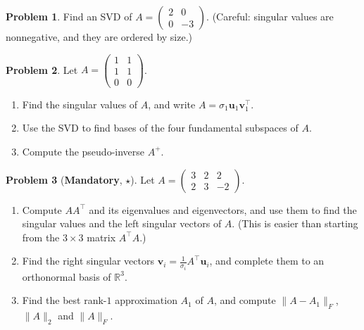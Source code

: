 \documentclass[11pt]{article}
\theoremstyle{definition}
\newtheorem{problem}{Problem}[section]
\newcommand{\mandatory}{\textcolor{red!70!black}{\textbf{Mandatory}}}
\newcommand{\norm}[1]{\lVert #1 \rVert}
\begin{document}
\begin{problem}\label{pr:svd-diag}
    Find an SVD of $A = \begin{pmatrix} 2 & 0 \\ 0 & -3 \end{pmatrix}$. (Careful: singular values are nonnegative, and they are ordered by size.)
\end{problem}

\begin{problem}\label{pr:svd-rank1}
    Let $A = \begin{pmatrix} 1 & 1 \\ 1 & 1 \\ 0 & 0 \end{pmatrix}$.
    \begin{enumerate}[label=(\alph*)]
        \item Find the singular values of $A$, and write $A = \sigma_1 \mathbf{u}_1 \mathbf{v}_1^\top$.
        \item Use the SVD to find bases of the four fundamental subspaces of $A$.
        \item Compute the pseudo-inverse $A^+$.
    \end{enumerate}
\end{problem}

\begin{problem}[\mandatory, $\star$]\label{pr:svd-2x3}
    Let $A = \begin{pmatrix} 3 & 2 & 2 \\ 2 & 3 & -2 \end{pmatrix}$.
    \begin{enumerate}[label=(\alph*)]
        \item Compute $AA^\top$ and its eigenvalues and eigenvectors, and use them to find the singular values and the left singular vectors of $A$. (This is easier than starting from the $3 \times 3$ matrix $A^\top A$.)
        \item Find the right singular vectors $\mathbf{v}_i = \frac{1}{\sigma_i} A^\top \mathbf{u}_i$, and complete them to an orthonormal basis of $\mathbb{R}^3$.
        \item Find the best rank-$1$ approximation $A_1$ of $A$, and compute $\norm{A - A_1}_F$, $\norm{A}_2$ and $\norm{A}_F$.
    \end{enumerate}
\end{problem}
\end{document}
